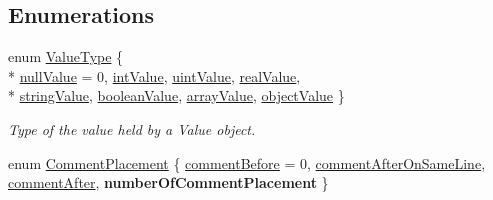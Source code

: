 \subsection*{Enumerations}
\begin{DoxyCompactItemize}
\item 
enum \hyperlink{namespace_json_a7d654b75c16a57007925868e38212b4e}{Value\-Type} \{ \\*
\hyperlink{namespace_json_a7d654b75c16a57007925868e38212b4ea7d9899633b4409bd3fc107e6737f8391}{null\-Value} =  0, 
\hyperlink{namespace_json_a7d654b75c16a57007925868e38212b4eae5a9d708d5c9e23ae9bf98898522512d}{int\-Value}, 
\hyperlink{namespace_json_a7d654b75c16a57007925868e38212b4eaea788d9a3bb00adc6d68d97d43e1ccd3}{uint\-Value}, 
\hyperlink{namespace_json_a7d654b75c16a57007925868e38212b4eab837c7b869c14d8be712deb45c9e490e}{real\-Value}, 
\\*
\hyperlink{namespace_json_a7d654b75c16a57007925868e38212b4ea804ef857affea2d415843c73f261c258}{string\-Value}, 
\hyperlink{namespace_json_a7d654b75c16a57007925868e38212b4ea14c30dbf4da86f7b809be299f671f7fd}{boolean\-Value}, 
\hyperlink{namespace_json_a7d654b75c16a57007925868e38212b4eadc8f264f36b55b063c78126b335415f4}{array\-Value}, 
\hyperlink{namespace_json_a7d654b75c16a57007925868e38212b4eae8386dcfc36d1ae897745f7b4f77a1f6}{object\-Value}
 \}
\begin{DoxyCompactList}\small\item\em Type of the value held by a Value object. \end{DoxyCompactList}\item 
enum \hyperlink{namespace_json_a4fc417c23905b2ae9e2c47d197a45351}{Comment\-Placement} \{ \hyperlink{namespace_json_a4fc417c23905b2ae9e2c47d197a45351a52f1733775460517b2ea6bedf4906d52}{comment\-Before} =  0, 
\hyperlink{namespace_json_a4fc417c23905b2ae9e2c47d197a45351a008a230a0586de54f30b76afe70fdcfa}{comment\-After\-On\-Same\-Line}, 
\hyperlink{namespace_json_a4fc417c23905b2ae9e2c47d197a45351ac5784ca53b12250888ddb642b06aebef}{comment\-After}, 
{\bfseries number\-Of\-Comment\-Placement}
 \}
\end{DoxyCompactItemize}
